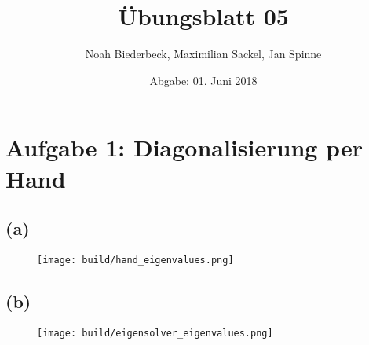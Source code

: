 \documentclass{scrartcl}
\title{Übungsblatt 05}
\author{%
		Noah Biederbeck, Maximilian Sackel, Jan Spinne
}
\date{Abgabe: 01. Juni 2018}
\begin{document}
\maketitle

\section*{Aufgabe 1: Diagonalisierung per Hand}
\subsection*{(a)}
\begin{figure}[ht]
  \centering
  \texttt{[image: build/hand\_eigenvalues.png]}
  \caption{}%
  \label{fig:eigenvalues_hand}
\end{figure}
\subsection*{(b)}
\begin{figure}[ht]
  \centering
  \texttt{[image: build/eigensolver\_eigenvalues.png]}
  \caption{}%
  \label{fig:eigenvalues_eigensolver}
\end{figure}
\end{document}
